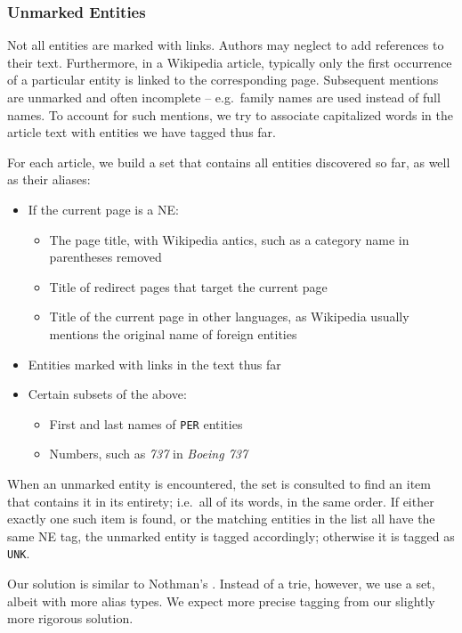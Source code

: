 \documentclass[11pt]{article}
\begin{document}
\subsubsection{Unmarked Entities}

Not all entities are marked with links. Authors may neglect to add references to their text. Furthermore, in a Wikipedia article, typically only the first occurrence of a particular entity is linked to the corresponding page. Subsequent mentions are unmarked and often incomplete -- e.g.~family names are used instead of full names. To account for such mentions, we try to associate capitalized words in the article text with entities we have tagged thus far.

For each article, we build a set that contains all entities discovered so far, as well as their aliases:
\begin{itemize}
\item If the current page is a NE:
  \begin{itemize}
  \item The page title, with Wikipedia antics, such as a category name in parentheses removed
  \item Title of redirect pages that target the current page
  \item Title of the current page in other languages, as Wikipedia usually mentions the original name of foreign entities
  \end{itemize}
\item Entities marked with links in the text thus far
\item Certain subsets of the above:
  \begin{itemize}
  \item First and last names of \texttt{PER} entities
  \item Numbers, such as \textit{737} in \textit{Boeing 737}
  \end{itemize}
\end{itemize}

When an unmarked entity is encountered, the set is consulted to find an item that contains it in its entirety; i.e.~all of its words, in the same order. If either exactly one such item is found, or the matching entities in the list all have the same NE tag, the unmarked entity is tagged accordingly; otherwise it is tagged as \texttt{UNK}.

Our solution is similar to Nothman's . Instead of a trie, however, we use a set, albeit with more alias types. We expect more precise tagging from our slightly more rigorous solution.
\end{document}
